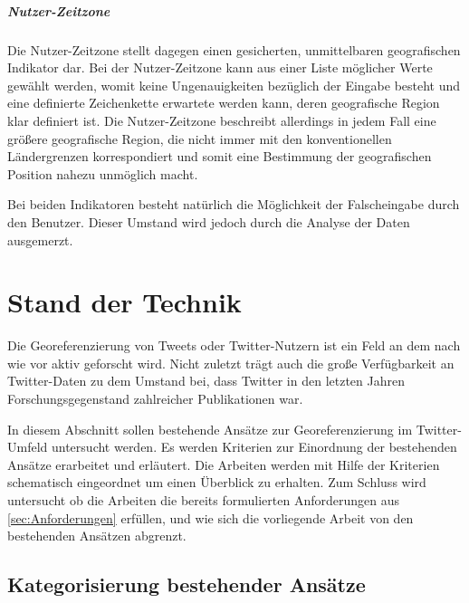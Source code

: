 					\paragraph{Nutzer-Zeitzone} 

						Die Nutzer-Zeitzone stellt dagegen einen gesicherten, unmittelbaren geografischen Indikator dar.
						Bei der Nutzer-Zeitzone kann aus einer Liste möglicher Werte gewählt werden, womit keine Ungenauigkeiten bezüglich der Eingabe besteht und eine definierte Zeichenkette erwartete werden kann, deren geografische Region klar definiert ist. 
						Die Nutzer-Zeitzone beschreibt allerdings in jedem Fall eine größere geografische Region, die nicht immer mit den konventionellen Ländergrenzen korrespondiert und somit eine Bestimmung der geografischen Position nahezu unmöglich macht.

						Bei beiden Indikatoren besteht natürlich die Möglichkeit der Falscheingabe durch den Benutzer. Dieser Umstand wird jedoch durch die Analyse der Daten ausgemerzt.  

	
		

			
\chapter{Stand der Technik} 
	Die Georeferenzierung von Tweets oder Twitter-Nutzern ist ein Feld an dem nach wie vor aktiv geforscht wird.
	Nicht zuletzt trägt auch die große Verfügbarkeit an Twitter-Daten zu dem Umstand bei, dass Twitter in den letzten Jahren Forschungsgegenstand zahlreicher Publikationen war. 
	
	In diesem Abschnitt sollen bestehende Ansätze zur Georeferenzierung im Twitter-Umfeld untersucht werden. 
	Es werden Kriterien zur Einordnung der bestehenden Ansätze erarbeitet und erläutert.   
	Die Arbeiten werden mit Hilfe der Kriterien schematisch eingeordnet um einen Überblick zu erhalten. 
	Zum Schluss wird untersucht ob die Arbeiten die bereits formulierten Anforderungen aus \ref{sec:Anforderungen} erfüllen, und wie sich die vorliegende Arbeit von den bestehenden Ansätzen abgrenzt.    

		\section{Kategorisierung bestehender Ansätze}

